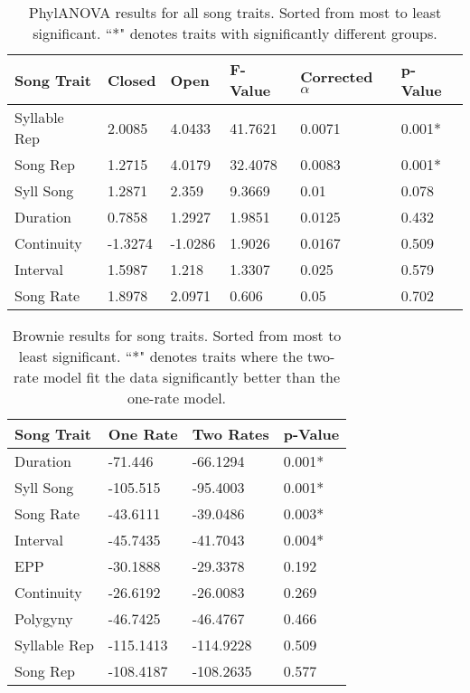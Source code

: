 \documentclass[a4paper,12pt]{article}
\begin{document}
\newcommand{\beginsupplement}{%
        \setcounter{table}{0}
        \renewcommand{\thetable}{S\arabic{table}}%
        \setcounter{figure}{0}
        \renewcommand{\thefigure}{S\arabic{figure}}%
     }

    
\begin{table}[ht]
\caption{PhylANOVA results for all song traits.  Sorted from most to least significant.  ``*" denotes traits with significantly different groups.}
\centering
\begin{tabular}{llllll}
  \hline
Song Trait & Closed & Open & F-Value & Corrected $\alpha$ & p-Value \\ 
  \hline
Syllable Rep & 2.0085 & 4.0433 & 41.7621 & 0.0071 & 0.001* \\ 
  Song Rep & 1.2715 & 4.0179 & 32.4078 & 0.0083 & 0.001* \\ 
  Syll Song & 1.2871 & 2.359 & 9.3669 & 0.01 & 0.078 \\ 
  Duration & 0.7858 & 1.2927 & 1.9851 & 0.0125 & 0.432 \\ 
  Continuity & -1.3274 & -1.0286 & 1.9026 & 0.0167 & 0.509 \\ 
  Interval & 1.5987 & 1.218 & 1.3307 & 0.025 & 0.579 \\ 
  Song Rate & 1.8978 & 2.0971 & 0.606 & 0.05 & 0.702 \\ 
   \hline
\end{tabular}
\end{table}


\begin{table}[ht]
\caption{Brownie results for song traits.  Sorted from most to least significant.  ``*" denotes traits where the two-rate model fit the data significantly better than the one-rate model.}
\centering
\begin{tabular}{llll}
  \hline
Song Trait & One Rate & Two Rates & p-Value \\ 
  \hline
Duration   & -71.446 & -66.1294 & 0.001* \\ 
  Syll Song   & -105.515 & -95.4003 & 0.001* \\ 
  Song Rate & -43.6111 & -39.0486 & 0.003* \\ 
  Interval   & -45.7435 & -41.7043 & 0.004* \\ 
  EPP   & -30.1888 & -29.3378 & 0.192 \\ 
  Continuity & -26.6192 & -26.0083 & 0.269 \\ 
  Polygyny   & -46.7425 & -46.4767 & 0.466 \\ 
  Syllable Rep   & -115.1413 & -114.9228 & 0.509 \\ 
  Song Rep   & -108.4187 & -108.2635 & 0.577 \\ 
   \hline
\end{tabular}
\end{table}
\end{document}
